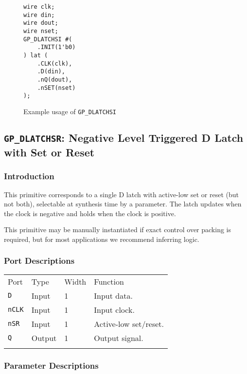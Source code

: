 \documentclass[11pt]{article}
\newcommand{\tokenstyle}[1]{\texttt{#1}}
\newcommand{\whenstyle}[1]{{\fontseries{sb}\selectfont#1}}
\newcommand{\thinhline}{\Xhline{1\arrayrulewidth}}
\newcommand{\thickhline}{\Xhline{2.5\arrayrulewidth}}
\begin{document}
\begin{figure}[h]
\begin{lstlisting}
wire clk;
wire din;
wire dout;
wire nset;
GP_DLATCHSI #(
	.INIT(1'b0)
) lat (
	.CLK(clk),
	.D(din),
	.nQ(dout),
	.nSET(nset)
);
\end{lstlisting}
\caption{Example usage of \tokenstyle{GP\_DLATCHSI}}
\label{gp-dlatchsi-example}
\end{figure}


\pagebreak
\subsection{\tokenstyle{GP\_DLATCHSR}: Negative Level Triggered D Latch with Set or Reset}
\label{gp-latchsr}

\subsubsection{Introduction}
This primitive corresponds to a single D latch with active-low set or reset (but not both), selectable at synthesis time by
a parameter. The latch updates when the clock is negative and holds when the clock is positive.

This primitive may be manually instantiated if exact control over packing is required, but for most applications we
recommend inferring logic.

\subsubsection{Port Descriptions}

\begin{tabularx}{\textwidth}{lllX}
\thinhline
\whenstyle{Port} & \whenstyle{Type} & \whenstyle{Width} & \whenstyle{Function} \\
\thickhline
\tokenstyle{D} & Input & 1 & Input data. \\
\thinhline
\tokenstyle{nCLK} & Input & 1 & Input clock. \\
\thinhline
\tokenstyle{nSR} & Input & 1 & Active-low set/reset. \\
\thinhline
\tokenstyle{Q} & Output & 1 & Output signal. \\
\thinhline
\end{tabularx}

\subsubsection{Parameter Descriptions}
\end{document}
